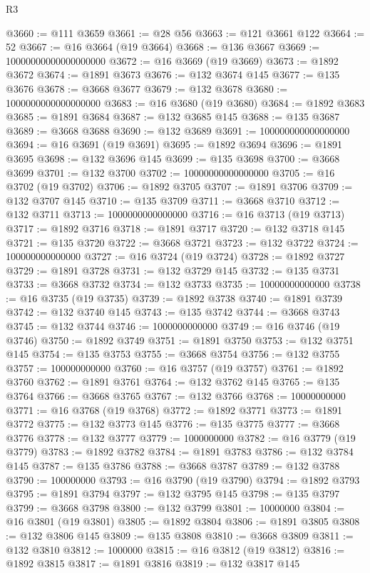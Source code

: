 \begin{lexlean}{R3}
\begin{coremodule}
@3660 := @111 @3659
@3661 := @28 @56
@3663 := @121 @3661 @122
@3664 := 52
@3667 := @16 @3664 (@19 @3664)
@3668 := @136 @3667
@3669 := 10000000000000000000
@3672 := @16 @3669 (@19 @3669)
@3673 := @1892 @3672
@3674 := @1891 @3673
@3676 := @132 @3674 @145
@3677 := @135 @3676
@3678 := @3668 @3677
@3679 := @132 @3678
@3680 := 1000000000000000000
@3683 := @16 @3680 (@19 @3680)
@3684 := @1892 @3683
@3685 := @1891 @3684
@3687 := @132 @3685 @145
@3688 := @135 @3687
@3689 := @3668 @3688
@3690 := @132 @3689
@3691 := 100000000000000000
@3694 := @16 @3691 (@19 @3691)
@3695 := @1892 @3694
@3696 := @1891 @3695
@3698 := @132 @3696 @145
@3699 := @135 @3698
@3700 := @3668 @3699
@3701 := @132 @3700
@3702 := 10000000000000000
@3705 := @16 @3702 (@19 @3702)
@3706 := @1892 @3705
@3707 := @1891 @3706
@3709 := @132 @3707 @145
@3710 := @135 @3709
@3711 := @3668 @3710
@3712 := @132 @3711
@3713 := 1000000000000000
@3716 := @16 @3713 (@19 @3713)
@3717 := @1892 @3716
@3718 := @1891 @3717
@3720 := @132 @3718 @145
@3721 := @135 @3720
@3722 := @3668 @3721
@3723 := @132 @3722
@3724 := 100000000000000
@3727 := @16 @3724 (@19 @3724)
@3728 := @1892 @3727
@3729 := @1891 @3728
@3731 := @132 @3729 @145
@3732 := @135 @3731
@3733 := @3668 @3732
@3734 := @132 @3733
@3735 := 10000000000000
@3738 := @16 @3735 (@19 @3735)
@3739 := @1892 @3738
@3740 := @1891 @3739
@3742 := @132 @3740 @145
@3743 := @135 @3742
@3744 := @3668 @3743
@3745 := @132 @3744
@3746 := 1000000000000
@3749 := @16 @3746 (@19 @3746)
@3750 := @1892 @3749
@3751 := @1891 @3750
@3753 := @132 @3751 @145
@3754 := @135 @3753
@3755 := @3668 @3754
@3756 := @132 @3755
@3757 := 100000000000
@3760 := @16 @3757 (@19 @3757)
@3761 := @1892 @3760
@3762 := @1891 @3761
@3764 := @132 @3762 @145
@3765 := @135 @3764
@3766 := @3668 @3765
@3767 := @132 @3766
@3768 := 10000000000
@3771 := @16 @3768 (@19 @3768)
@3772 := @1892 @3771
@3773 := @1891 @3772
@3775 := @132 @3773 @145
@3776 := @135 @3775
@3777 := @3668 @3776
@3778 := @132 @3777
@3779 := 1000000000
@3782 := @16 @3779 (@19 @3779)
@3783 := @1892 @3782
@3784 := @1891 @3783
@3786 := @132 @3784 @145
@3787 := @135 @3786
@3788 := @3668 @3787
@3789 := @132 @3788
@3790 := 100000000
@3793 := @16 @3790 (@19 @3790)
@3794 := @1892 @3793
@3795 := @1891 @3794
@3797 := @132 @3795 @145
@3798 := @135 @3797
@3799 := @3668 @3798
@3800 := @132 @3799
@3801 := 10000000
@3804 := @16 @3801 (@19 @3801)
@3805 := @1892 @3804
@3806 := @1891 @3805
@3808 := @132 @3806 @145
@3809 := @135 @3808
@3810 := @3668 @3809
@3811 := @132 @3810
@3812 := 1000000
@3815 := @16 @3812 (@19 @3812)
@3816 := @1892 @3815
@3817 := @1891 @3816
@3819 := @132 @3817 @145

\end{coremodule}
\end{lexlean}
